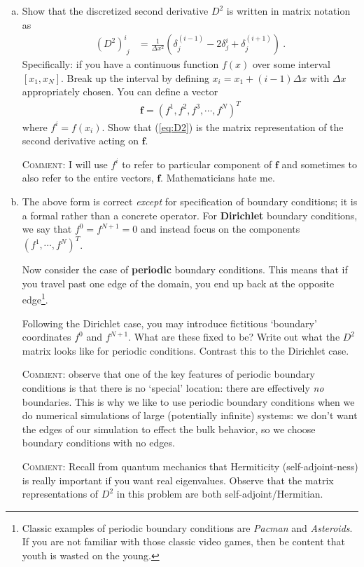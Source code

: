 \documentclass[12pt]{article}
\numberwithin{equation}{section}    %
\renewcommand{\vec}[1]{\mathbf{#1}} %
\begin{document}
\begin{enumerate}[(a)]
	\item Show that the discretized second derivative $D^2$ is written in matrix notation as
\begin{align}
	\left(D^2\right)^i_{\phantom{i}j}
	&= 
	\frac{1}{\Delta x^2}
	\left(
	\delta_j^{(i-1)}
	- 2 \delta_j^{i}
	+
	\delta_j^{(i+1)}
	\right) \ .
	\label{eq:D2}
\end{align}
Specifically: if you have a continuous function $f(x)$ over some interval $[x_1, x_N]$. Break up the interval by defining $x_i = x_1 + (i-1)\Delta x$ with $\Delta x$ appropriately chosen. You can define a vector
\begin{align}
	\vec{f} = (f^1, f^2, f^3, \cdots, f^N)^T
\end{align}
where $f^i = f(x_i)$. Show that (\ref{eq:D2}) is the matrix representation of the second derivative acting on $\vec{f}$. 

\textsc{Comment}: I will use $f^i$ to refer to particular component of $\vec{f}$ and  sometimes to also refer to the entire vectors, $\vec{f}$. Mathematicians hate me.

\item The above form is correct \emph{except} for specification of boundary conditions; it is a formal rather than a concrete operator. For \textbf{Dirichlet} boundary conditions, we say that $f^0 = f^{N+1} = 0$ and instead focus on the components $\left(f^1, \cdots, f^N\right)^T$. 

Now consider the case of \textbf{periodic} boundary conditions. This means that if you travel past one edge of the domain, you end up back at the opposite edge\footnote{Classic examples of periodic boundary conditions are \emph{Pacman} and \emph{Asteroids}. If you are not familiar with those classic video games, then be content that youth is wasted on the young.}.

Following the Dirichlet case, you may introduce fictitious `boundary' coordinates $f^0$ and $f^{N+1}$. What are these fixed to be? Write out what the $D^2$ matrix looks like for periodic conditions. Contrast this to the Dirichlet case.

\textsc{Comment}: observe that one of the key features of periodic boundary conditions is that there is no `special' location: there are effectively \emph{no} boundaries. This is why we like to use periodic boundary conditions when we do numerical simulations of large (potentially infinite) systems: we don't want the edges of our simulation to effect the bulk behavior, so we choose boundary conditions with no edges.

\textsc{Comment}: Recall from quantum mechanics that Hermiticity (self-adjoint-ness) is really important if you want real eigenvalues. Observe that the matrix representations of $D^2$ in this problem are both self-adjoint/Hermitian. 



\end{enumerate}
\end{document}
